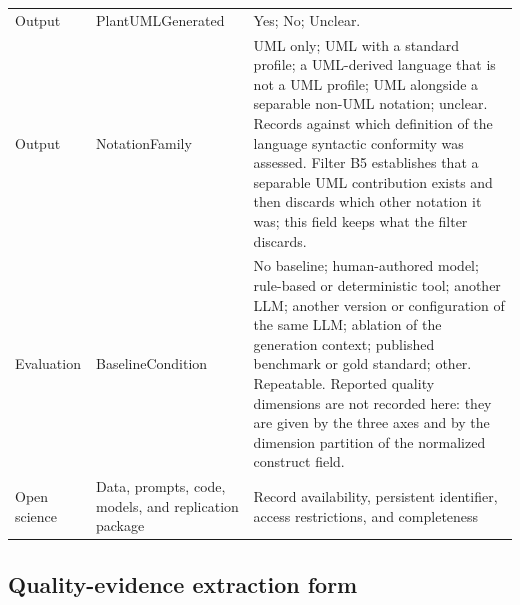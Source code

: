 \begin{longtable}{p{} p{} p{}}
Output & PlantUMLGenerated & Yes; No; Unclear. \\
Output & NotationFamily & UML only; UML with a standard profile; a UML-derived language that is not a UML profile; UML alongside a separable non-UML notation; unclear. Records against which definition of the language syntactic conformity was assessed. Filter B5 establishes that a separable UML contribution exists and then discards which other notation it was; this field keeps what the filter discards. \\
Evaluation & BaselineCondition & No baseline; human-authored model; rule-based or deterministic tool; another LLM; another version or configuration of the same LLM; ablation of the generation context; published benchmark or gold standard; other. Repeatable. Reported quality dimensions are not recorded here: they are given by the three axes and by the dimension partition of the normalized construct field. \\
Open science & Data, prompts, code, models, and replication package & Record availability, persistent identifier, access restrictions, and completeness \\
\bottomrule
\end{longtable}

\subsection{Quality-evidence extraction form}

